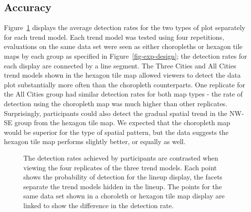 \documentclass[
doublespace,
  times]{anzsauth}
\begin{document}
\subsection{Accuracy}\label{accuracy}

Figure~\ref{fig-detect-compare} displays the average detection rates for
the two types of plot separately for each trend model. Each trend model
was tested using four repetitions, evaluations on the same data set were
seen as either choropleths or hexagon tile maps by each group as
specified in Figure~\ref{fig-exp-design}; the detection rates for each
display are connected by a line segment. The Three Cities and All Cities
trend models shown in the hexagon tile map allowed viewers to detect the
data plot substantially more often than the choropleth counterparts. One
replicate for the All Cities group had similar detection rates for both
map types - the rate of detection using the choropleth map was much
higher than other replicates. Surprisingly, participants could also
detect the gradual spatial trend in the NW-SE group from the hexagon
tile map. We expected that the choropleth map would be superior for the
type of spatial pattern, but the data suggests the hexagon tile map
performs slightly better, or equally as well.

\begin{figure}


\caption{\label{fig-detect-compare}The detection rates achieved by
participants are contrasted when viewing the four replicates of the
three trend models. Each point shows the probability of detection for
the lineup display, the facets separate the trend models hidden in the
lineup. The points for the same data set shown in a choroleth or hexagon
tile map display are linked to show the difference in the detection
rate.}

\end{figure}%
\end{document}

